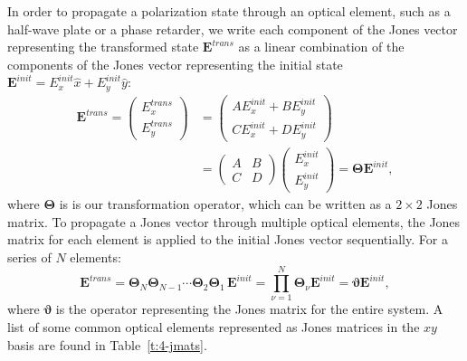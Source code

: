 In order to propagate a polarization state through an optical element, such as a half-wave plate or a phase retarder, we write each component of the Jones vector representing the transformed state $\mathbf{E}^{trans}$ as a linear combination of the components of the Jones vector representing the initial state $\mathbf{E}^{init} = E^{init}_{x}\hat{x}+E^{init}_{y}\hat{y}$:
\begin{align}
\mathbf{E}^{trans} = \left ( \begin{array}{c} E^{trans}_{x} \\ E^{trans}_{y} \end{array} \right ) &= \left ( \begin{array}{c} A E^{init}_{x} + B E^{init}_{y} \\ C E^{init}_{x}+ D E^{init}_{y} \end{array} \right ) \nonumber \\
&= \left ( \begin{array}{cc} A & B \\C & D \end{array} \right )\left ( \begin{array}{c} E^{init}_{x} \\ E^{init}_{y} \end{array} \right ) = \bm{\Theta} \mathbf{E}^{init},
\end{align}
where $\bm{\Theta}$ is is our transformation operator, which can be written as a $2 \times 2$ Jones matrix.
To propagate a Jones vector through multiple optical elements, the Jones matrix for each element is applied to the initial Jones vector sequentially.
For a series of $N$ elements:
\begin{equation}
\mathbf{E}^{trans} = \bm{\Theta}_N \bm{\Theta}_{N-1} \cdots \bm{\Theta}_2 \bm{\Theta}_1\, \mathbf{E}^{init} = \prod\limits^N_{\nu=1} \bm{\Theta}_{\nu} \mathbf{E}^{init} = \bm{\vartheta} \mathbf{E}^{init},
\end{equation}
where $\bm{\vartheta}$ is the operator representing the Jones matrix for the entire system.
A list of some common optical elements represented as Jones matrices in the $xy$ basis are found in Table~\ref{t:4-jmats}.
